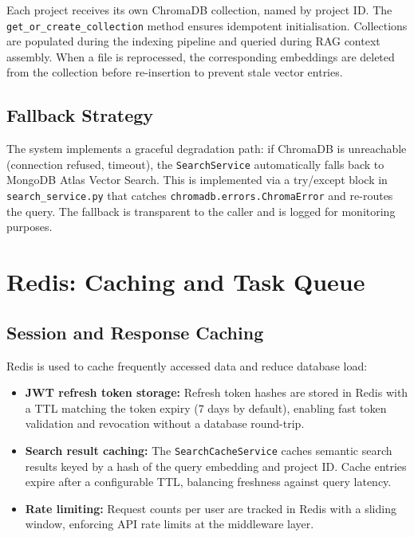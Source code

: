 Each project receives its own ChromaDB collection, named by project ID. The \texttt{get\_or\_create\_collection} method ensures idempotent initialisation. Collections are populated during the indexing pipeline and queried during RAG context assembly. When a file is reprocessed, the corresponding embeddings are deleted from the collection before re-insertion to prevent stale vector entries.

\subsection{Fallback Strategy}

The system implements a graceful degradation path: if ChromaDB is unreachable (connection refused, timeout), the \texttt{SearchService} automatically falls back to MongoDB Atlas Vector Search. This is implemented via a try/except block in \texttt{search\_service.py} that catches \texttt{chromadb.errors.ChromaError} and re-routes the query. The fallback is transparent to the caller and is logged for monitoring purposes.

\section{Redis: Caching and Task Queue}
\label{sec:redis}

\subsection{Session and Response Caching}

Redis is used to cache frequently accessed data and reduce database load:

\begin{itemize}
    \item \textbf{JWT refresh token storage:} Refresh token hashes are stored in Redis with a TTL matching the token expiry (7 days by default), enabling fast token validation and revocation without a database round-trip.
    \item \textbf{Search result caching:} The \texttt{SearchCacheService} caches semantic search results keyed by a hash of the query embedding and project ID. Cache entries expire after a configurable TTL, balancing freshness against query latency.
    \item \textbf{Rate limiting:} Request counts per user are tracked in Redis with a sliding window, enforcing API rate limits at the middleware layer.
\end{itemize}

